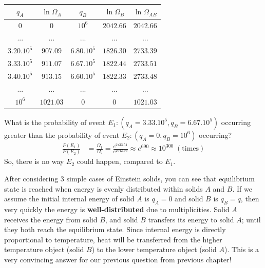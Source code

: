 \documentclass[~/PhyAI/phyai.tex]{subfiles}
\begin{document}
\begin{center}
	\begin{tabular}{ |c|c|c|c|c| }
		\hline
		$q_{A}$       & $\ln\Omega_{A}$ & $q_{B}$       & $\ln\Omega_{B}$ & $\ln\Omega_{AB}$ \\
		\hline
		0             & 0               & $10^{6}$      & $2042.66$       & $2042.66$        \\
		...           & ...             & ...           & ...             & ...              \\
		$3.20.10^{5}$ & $907.09$        & $6.80.10^{5}$ & $1826.30$       & $2733.39$        \\
		$3.33.10^{5}$ & $911.07$        & $6.67.10^{5}$ & $1822.44$       & $2733.51$        \\
		$3.40.10^{5}$ & $913.15$        & $6.60.10^{5}$ & $1822.33$       & $2733.48$        \\
		...           & ...             & ...           & ...             & ...              \\
		$10^{6}$      & $1021.03$       & $0$           & $0$             & $1021.03$        \\
		\hline
	\end{tabular}
\end{center}
\begin{exmp}
	What is the probability of event $E_{1}:(q_{A}=3.33.10^{5}, q_{B}=6.67.10^{5})$  occurring greater than the probability of event $E_{2}:(q_{A}=0, q_{B}=10^{6})$ occurring?
	\begin{equation*}
		\begin{split}
			\frac{P(E_{1} )}{P(E_{2})}&=\frac{\Omega_{1} }{\Omega_{2}}=\frac{e^{2733.51 }}{e^{2042.66}}\approx e^{690}\approx 10^{300}\;(\text{times})
		\end{split}
	\end{equation*}
	So, there is no way $E_{2}$ could happen, compared to $E_{1}$.
\end{exmp}
After considering $3$ simple cases of Einstein solids, you can see that equilibrium state is reached when energy is evenly distributed within solids $A$ and $B$. If we assume the initial internal energy of solid $A$ is $q_{A}=0$ and solid $B$ is $q_{B}=q$, then very quickly the energy is \textbf{well-distributed} due to multiplicities. Solid $A$ receives the energy from solid $B$, and solid $B$ transfers its energy to solid $A$; until they both reach the equilibrium state. Since internal energy is directly proportional to temperature, heat will be transferred from the higher temperature object (solid $B$) to the lower temperature object (solid $A$). This is a very convincing answer for our previous question from previous chapter!
\end{document}
